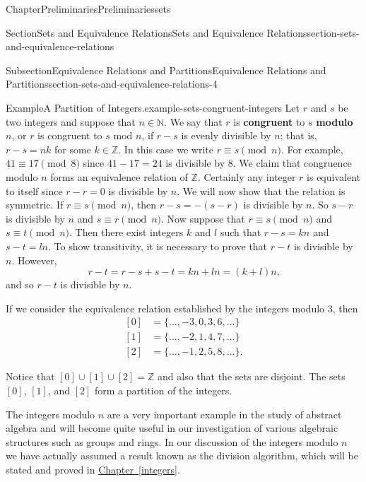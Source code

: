 \documentclass[oneside,10pt,]{book}
\newcommand{\xreffont}{\relax}
\newcommand{\terminology}[1]{\textbf{#1}}
\numberwithin{equation}{section}
\begin{document}
\begin{chapterptx}{Chapter}{Preliminaries}{}{Preliminaries}{}{}{sets}
\begin{sectionptx}{Section}{Sets and Equivalence Relations}{}{Sets and Equivalence Relations}{}{}{section-sets-and-equivalence-relations}
\begin{subsectionptx}{Subsection}{Equivalence Relations and Partitions}{}{Equivalence Relations and Partitions}{}{}{section-sets-and-equivalence-relations-4}
\begin{example}{Example}{A Partition of Integers.}{example-sets-congruent-integers}
Let \(r\) and \(s\) be two integers and suppose that \(n \in {\mathbb N}\).  We say that \(r\) is \terminology{congruent} to \(s\) \terminology{modulo} \(n\), or \(r\) is congruent to \(s\) mod \(n\), if \(r - s\) is evenly divisible by \(n\); that is, \(r - s = nk\)  for some \(k \in {\mathbb Z}\).  In this case we write \(r \equiv s \pmod{n}\).  \label{example-sets-congruent-integers-2-18}  For example, \(41 \equiv 17 \pmod{ 8}\) since \(41 - 17=24\) is divisible by 8.  We claim that congruence modulo \(n\) forms an equivalence relation of \({\mathbb Z}\).  Certainly any integer \(r\) is equivalent to itself since \(r - r = 0\) is divisible by \(n\).  We will now show that the relation is symmetric.  If \(r \equiv s \pmod{ n}\), then \(r - s = -(s -r)\) is divisible by \(n\). So \(s - r\) is divisible by \(n\) and \(s \equiv r \pmod{ n}\).  Now suppose that \(r \equiv s \pmod{ n}\) and \(s \equiv t \pmod{ n}\).  Then there exist integers \(k\) and \(l\) such that \(r -s = kn\) and \(s - t = ln\).  To show transitivity, it is necessary to prove that \(r - t\) is divisible by \(n\).  However,%
\begin{equation*}
r - t = r - s + s - t = kn + ln = (k + l)n\text{,}
\end{equation*}
and so \(r - t\) is divisible by \(n\).%
\par
If we consider the equivalence relation established by the integers modulo 3, then%
\begin{align*}
{[0]} & = \{ \ldots, -3, 0, 3, 6, \ldots \}\\
{[1]} & = \{ \ldots, -2, 1, 4, 7, \ldots \}\\
{[2]} & = \{ \ldots, -1, 2, 5, 8, \ldots \}\text{.}
\end{align*}
%
\par
Notice that \([0] \cup [1] \cup [2] = {\mathbb Z}\) and also that the sets are disjoint.  The sets \([0]\), \([1]\), and \([2]\) form a partition of the integers.%
\par
The integers modulo \(n\) are a very important example in the study of abstract algebra and will become quite useful in our investigation of various algebraic structures such as groups and rings.  In our discussion of the integers modulo \(n\) we have actually assumed a result known as the division algorithm, which will be stated and proved in \hyperref[integers]{Chapter~{\xreffont\ref{integers}}}.%
\end{example}
\end{subsectionptx}
\end{sectionptx}

\end{chapterptx}
\end{document}
